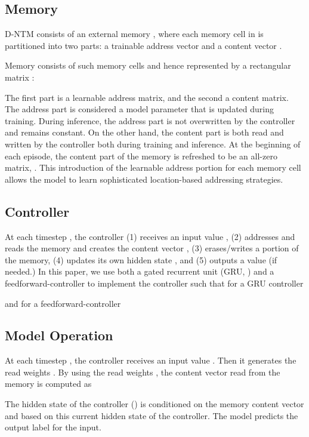\documentclass[12pt]{article}
\begin{document}
\subsection{Memory}

D-NTM consists of an external memory , where each memory cell  in  is partitioned into two parts: a trainable address vector  and a content vector .

Memory  consists of  such memory cells and hence represented by a rectangular matrix :

The first part  is a learnable address matrix, and the second  a content matrix. The address part  is considered a model parameter that is updated during
training. During inference, the address part is not overwritten by the
controller and remains constant. On the other hand, the content part  is
both read and written by the controller both during training and inference. At
the beginning of each episode, the content part of the memory is refreshed to be an
all-zero matrix, . This introduction of the learnable address portion for each memory cell allows the model to learn sophisticated location-based addressing strategies. 

\subsection{Controller}

At each timestep , the controller (1) receives an input value , (2)
addresses and reads the memory and creates the content vector , (3) erases/writes a
portion of the memory, (4) updates its own hidden state , and (5) outputs
a value  (if needed.) In this paper, we use both a gated recurrent unit (GRU,
\citep{cho2014learning}) and a feedforward-controller to implement the controller such that for a GRU controller

and for a feedforward-controller


\subsection{Model Operation}

At each timestep , the controller receives an input value . Then it generates the read weights . By using the read weights , the content vector read from the memory  is computed as

The hidden state of the controller () is conditioned on the memory content vector  and based on this current hidden state of the controller. The model predicts the output label  for the input. 
\end{document}
